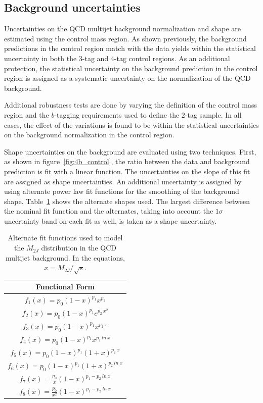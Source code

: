\subsection{Background uncertainties}

Uncertainties on the QCD multijet background normalization and shape are estimated using the control mass region. As shown previously, the background predictions in the control region match with the data yields within the statistical uncertainty in both the $3$-tag and $4$-tag control regions. As an additional protection, the statistical uncertainty on the background prediction in the control region is assigned as a systematic uncertainty on the normalization of the QCD background. 

Additional robustness tests are done by varying the definition of the control mass region and the $b$-tagging requirements used to define the $2$-tag sample. In all cases, the effect of the variations is found to be within the statistical uncertainties on the background normalization in the control region. 

Shape uncertainties on the background are evaluated using two techniques. First, as shown in figure~\ref{fig:4b_control}, the ratio between the data and background prediction is fit with a linear function. The uncertainties on the slope of this fit are assigned as shape uncertainties. An additional uncertainty is assigned by using alternate power law fit functions for the smoothing of the background shape. Table~\ref{tab:SystFunctions} shows the alternate shapes used. The largest difference between the nominal fit function and the alternates, taking into account the $1\sigma$ uncertainty band on each fit as well, is taken as a shape uncertainty. 

\begin{table}[htbp!]
\begin{center} 
\begin{tabular}{|c|}
\hline
Functional Form \\
\hline
$f_{1}(x) = p_0 (1-x)^{p_1} x^{p_2}$ \\
$f_{2}(x) = p_0 (1-x)^{p_1} e^{p_2\ x^2}$ \\
$f_{3}(x) = p_0 (1-x)^{p_1} x^{p_2\ x}$ \\
$f_{4}(x) = p_0 (1-x)^{p_1} x^{p_2\ ln\ x}$ \\
$f_{5}(x) = p_0 (1-x)^{p_1} (1+x)^{p_2\ x}$ \\
$f_{6}(x) = p_0 (1-x)^{p_1} (1+x)^{p_2\ ln\ x}$ \\
$f_{7}(x) = \frac{p_0}{x} (1-x)^{p_1 - p_2\ ln\ x}$ \\
$f_{8}(x) = \frac{p_0}{x^2} (1-x)^{p_1 - p_2\ ln\ x}$ \\
\hline
\end{tabular}
\caption{Alternate fit functions used to model the $M_{2J}$ distribution in the QCD multijet background. In the equations, $x = M_{2J} / \sqrt{s}$.}
\label{tab:SystFunctions}
\end{center}
\end{table}

